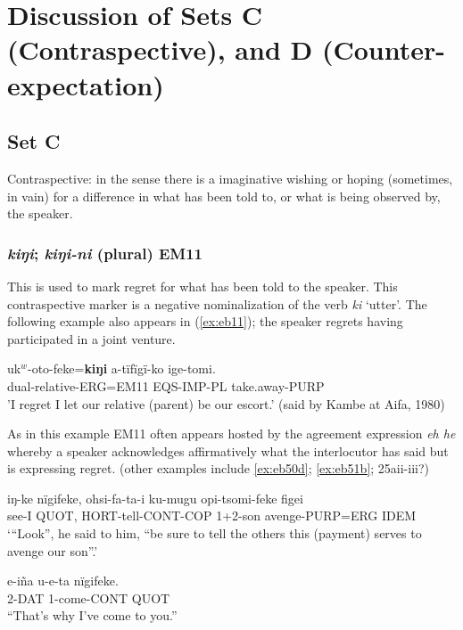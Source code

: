 \documentclass[output=paper]{langsci/langscibook}
\begin{document}
\section{Discussion of Sets C (Contraspective), and D (Counter-expectation)}\label{s:eb3}

\subsection{Set C}
Contraspective: in the sense there is a imaginative wishing or hoping  (sometimes, in vain) for a difference in what has been told to, or what is being observed by, the speaker. 

\subsubsection{\textit{kiŋi}; \textit{kiŋi-ni} (plural) EM11} 
This is used to mark regret for what has been told to the speaker. This contraspective marker is a negative nominalization of the verb \textit{ki} ‘utter’. The following example also appears in (\ref{ex:eb11}); the speaker regrets having participated in a joint venture.

\begin{exe}
	\ex \label{ex:eb27}
	\gll uk$^w$-oto-feke=\textbf{kiŋi} a-tïfïgï-ko ige-tomi.\\
	dual-relative-ERG=EM11 EQS-IMP-PL take.away-PURP\\
	\trans 'I regret I let our relative (parent) be our escort.' (said by Kambe at Aifa, 1980)
\end{exe}

As in this example EM11 often appears hosted by the agreement expression \textit{eh he} whereby a speaker acknowledges affirmatively what the interlocutor has said but is expressing regret. (other examples include \ref{ex:eb50d}; \ref{ex:eb51b}; 25aii-iii?) %

\begin{exe}
	\ex \label{ex:eb28}
	\gll iŋ-ke nïgifeke, ohsi-fa-ta-i ku-mugu opi-tsomi-feke figei\\
	see-I QUOT, HORT-tell-CONT-COP 1+2-son avenge-PURP=ERG IDEM\\
	\trans ‘“Look”, he said to him, “be sure to tell the others this (payment) serves to avenge our son”.’
\end{exe}

\begin{exe}
	\ex \label{ex:eb29}
	\gll e-iña u-e-ta nïgifeke.\\
	2-DAT 1-come-CONT QUOT\\
	\trans “That’s why I’ve come to you.”  
\end{exe}
\end{document}
